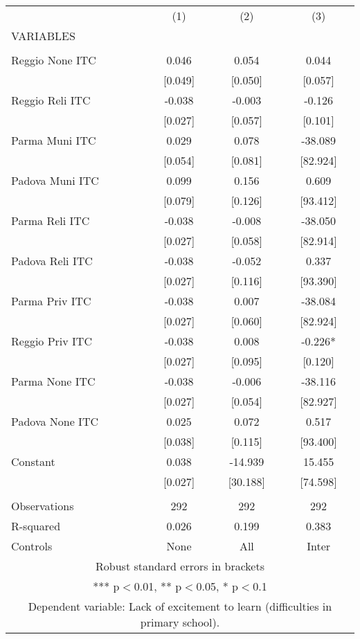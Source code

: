 \begin{tabular}{lccc} \hline
 & (1) & (2) & (3) \\
VARIABLES &  &  &  \\ \hline
 &  &  &  \\
Reggio None ITC & 0.046 & 0.054 & 0.044 \\
 & [0.049] & [0.050] & [0.057] \\
Reggio Reli ITC & -0.038 & -0.003 & -0.126 \\
 & [0.027] & [0.057] & [0.101] \\
Parma Muni ITC & 0.029 & 0.078 & -38.089 \\
 & [0.054] & [0.081] & [82.924] \\
Padova Muni ITC & 0.099 & 0.156 & 0.609 \\
 & [0.079] & [0.126] & [93.412] \\
Parma Reli ITC & -0.038 & -0.008 & -38.050 \\
 & [0.027] & [0.058] & [82.914] \\
Padova Reli ITC & -0.038 & -0.052 & 0.337 \\
 & [0.027] & [0.116] & [93.390] \\
Parma Priv ITC & -0.038 & 0.007 & -38.084 \\
 & [0.027] & [0.060] & [82.924] \\
Reggio Priv ITC & -0.038 & 0.008 & -0.226* \\
 & [0.027] & [0.095] & [0.120] \\
Parma None ITC & -0.038 & -0.006 & -38.116 \\
 & [0.027] & [0.054] & [82.927] \\
Padova None ITC & 0.025 & 0.072 & 0.517 \\
 & [0.038] & [0.115] & [93.400] \\
Constant & 0.038 & -14.939 & 15.455 \\
 & [0.027] & [30.188] & [74.598] \\
 &  &  &  \\
Observations & 292 & 292 & 292 \\
R-squared & 0.026 & 0.199 & 0.383 \\
 Controls & None & All & Inter \\ \hline
\multicolumn{4}{c}{ Robust standard errors in brackets} \\
\multicolumn{4}{c}{ *** p$<$0.01, ** p$<$0.05, * p$<$0.1} \\
\multicolumn{4}{c}{ Dependent variable: Lack of excitement to learn (difficulties in primary school).} \\
\end{tabular}
